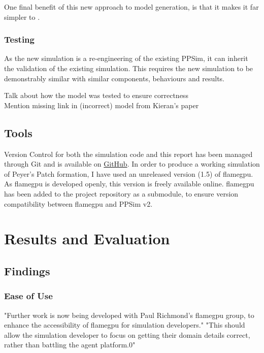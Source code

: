 \documentclass{UoYCSproject}
\begin{document}
One final benefit of this new approach to model generation, is that it makes it far simpler to .


\subsection{Testing}
As the new simulation is a re-engineering of the existing PPSim, it can inherit the validation of the existing simulation.
This requires the new simulation to be demonstrably similar with similar components, behaviours and results.

Talk about how the model was tested to ensure correctness\\
Mention missing link in (incorrect) model from Kieran's paper 

\section{Tools}
Version Control for both the simulation code and this report has been managed through Git and is available on \href{https://github.com/oliver-binns/PRIY.git}{GitHub}.
In order to produce a working simulation of Peyer's Patch formation, I have used an unreleased version (1.5) of \acrshort{flamegpu}.
As \acrshort{flamegpu} is developed openly, this version is freely available online\cite{flame_github}. \acrshort{flamegpu} has been added to the project repository as a submodule, to ensure version compatibility between \acrshort{flamegpu} and PPSim v2.




\chapter{Results and Evaluation}
\label{results}

\section{Findings}
\subsection{Ease of Use}
"Further work is now being developed with Paul Richmond's \acrshort{flamegpu} group, to enhance the accessibility of \acrshort{flamegpu} for simulation developers."
"This should allow the simulation developer to focus on getting their domain details correct, rather than battling the agent platform.0"
\end{document}
